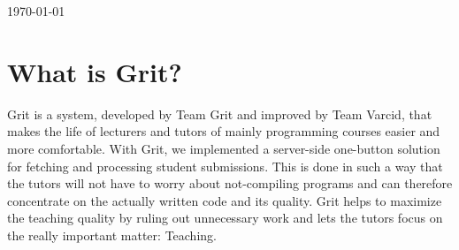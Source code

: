 \documentclass[10pt,a4paper, titlepage, toc=idx]{scrreprt}
\theoremstyle{definition}
\theoremstyle{plain}
\newcommand*{\product}{Grit}
\begin{document}
\begin{titlepage}
\begin{center}
			
    \vfill
			
    {\large \today}
			
  \end{center}
\end{titlepage}
\setcounter{tocdepth}{1}
	
\setcounter{page}{2} \cleardoublepage
\tableofcontents
\chapter{What is \product?}
\product{} is a system, developed by {\sc Team
  Grit} and improved by {\sc Team Varcid}, that makes the life of lecturers and
tutors of mainly programming courses easier and more comfortable. With
\product, we implemented a server-side one-button solution for
fetching and processing student submissions. This is done in such a
way that the tutors will not have to worry about not-compiling
programs and can therefore concentrate on the actually written code
and its quality. \product{} helps to maximize the teaching quality by
ruling out unnecessary work and lets the tutors focus on the really
important matter: Teaching.
\end{document}
